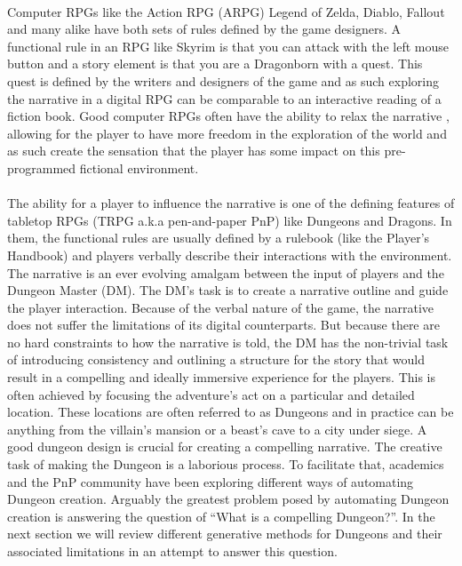 \documentclass{UoYCSproject}
\begin{document}
\paragraph{}
Computer RPGs like the Action RPG (ARPG) Legend of Zelda, Diablo, Fallout and many alike have both sets of rules defined by the game designers. A functional rule in an RPG like Skyrim is that you can attack with the left mouse button and a story element is that you are a Dragonborn with a quest. This quest is defined by the writers and designers of the game and as such exploring the narrative in a digital RPG can be comparable to an interactive reading of a fiction book. Good computer RPGs often have the ability to relax the narrative \parencite{TychsenGM}, allowing for the player to have more freedom in the exploration of the world and as such create the sensation that the player has some impact on this pre-programmed fictional environment.

\paragraph{}
The ability for a player to influence the narrative is one of the defining features of tabletop RPGs (TRPG a.k.a pen-and-paper PnP) like Dungeons and Dragons. In them, the functional rules are usually defined by a rulebook (like the Player’s Handbook) and players verbally describe their interactions with the environment. The narrative is an ever evolving amalgam between the input of players and the Dungeon Master (DM). The DM’s task is to create a narrative outline and guide the player interaction. Because of the verbal nature of the game, the narrative does not suffer the limitations of its digital counterparts. But because there are no hard constraints to how the narrative is told, the DM has the non-trivial task of introducing consistency and outlining a structure for the story that would result in a compelling and ideally immersive experience for the players. This is often achieved by focusing the adventure’s act on a particular and detailed location. These locations are often referred to as Dungeons and in practice can be anything from the villain's mansion or a beast’s cave to a city under siege. A good dungeon design is crucial for creating a compelling narrative. The creative task of making the Dungeon is a laborious process. To facilitate that, academics and the PnP community have been exploring different ways of automating Dungeon creation. Arguably the greatest problem posed by automating Dungeon creation is answering the question of “What is a compelling Dungeon?”. In the next section we will review different generative methods for Dungeons and their associated limitations in an attempt to answer this question.
\end{document}
